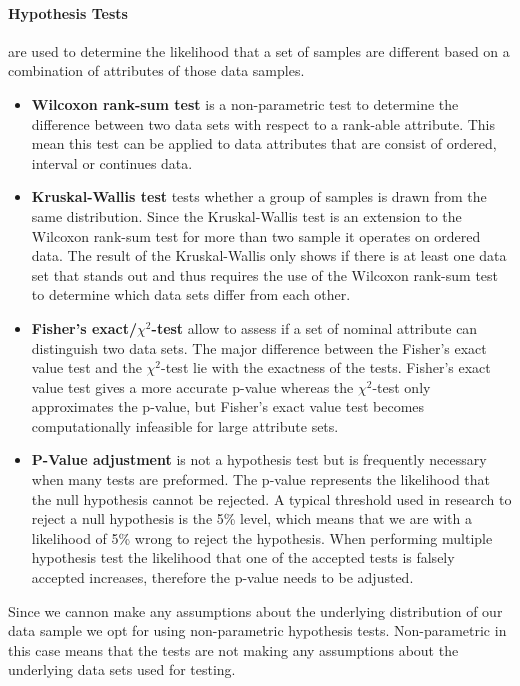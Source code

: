 \paragraph{Hypothesis Tests} are used to determine the likelihood that a set of samples are different based on a combination of attributes of those data samples.

\begin{itemize}
\item\textbf{Wilcoxon rank-sum test} is a non-parametric test to determine the difference between two data sets with respect to a rank-able attribute.
This mean this test can be applied to data attributes that are consist of ordered, interval or continues data.

\item\textbf{Kruskal-Wallis test} tests whether a group of samples is drawn from the same distribution.
Since the Kruskal-Wallis test is an extension to the Wilcoxon rank-sum test for more than two sample it operates on ordered data.
The result of the Kruskal-Wallis only shows if there is at least one data set that stands out and thus requires the use of the Wilcoxon rank-sum test to determine which data sets differ from each other.

\item\textbf{Fisher's exact/$\chi^2$-test} allow to assess if a set of nominal attribute can distinguish two data sets. 
The major difference between the Fisher's exact value test and the $\chi^2$-test lie with the exactness of the tests.
Fisher's exact value test gives a more accurate p-value whereas the $\chi^2$-test only approximates the p-value, but Fisher's exact value test becomes computationally infeasible for large attribute sets.

\item\textbf{P-Value adjustment} is not a hypothesis test but is frequently necessary when many tests are preformed.
The p-value represents the likelihood that the null hypothesis cannot be rejected.
A typical threshold used in research to reject a null hypothesis is the 5\% level, which means that we are with a likelihood of 5\% wrong to reject the hypothesis.
When performing multiple hypothesis test the likelihood that one of the accepted tests is falsely accepted increases, therefore the p-value needs to be adjusted.
\end{itemize}

Since we cannon make any assumptions about the underlying distribution of our data sample we opt for using non-parametric hypothesis tests.
Non-parametric in this case means that the tests are not making any assumptions about the underlying data sets used for testing.


